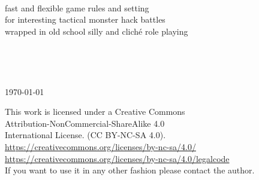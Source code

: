 \documentclass[11pt, twoside, titlepage, a4paper]{report}
\newcommand{\vsmall}{\footnotesize}  %
\begin{document}
\begin{titlepage}
\begin{center}
   \vspace{2 cm} %


   \ %

   \large{
       fast and flexible game rules and setting\\
       for interesting tactical monster hack battles\\
       wrapped in old school silly and cliché role playing
   }



   \vfill %


   \ %



   \ %

   \normalsize{\today}

\end{center}


\end{titlepage}




\clearpage
\thispagestyle{empty}
\raggedbottom

\vsmall
\noindent
This work is licensed under a Creative Commons \\
Attribution-NonCommercial-ShareAlike 4.0 \\
International License. (CC BY-NC-SA 4.0).\\
\url{https://creativecommons.org/licenses/by-nc-sa/4.0/} \\
\url{https://creativecommons.org/licenses/by-nc-sa/4.0/legalcode} \\
If you want to use it in any other fashion please contact the author.

\

\end{document}
